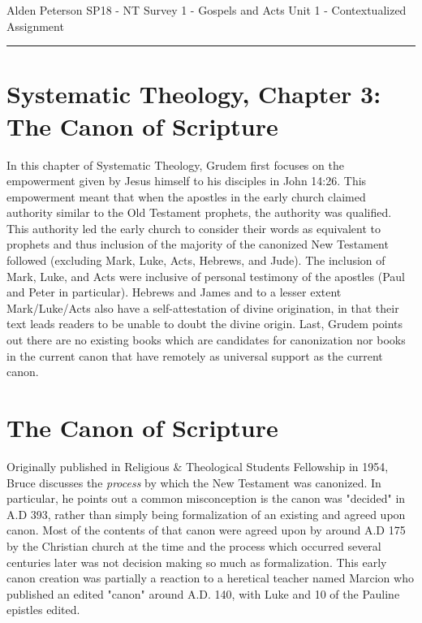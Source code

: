 \documentclass[12pt]{turabian-researchpaper}
\begin{document}
\begin{singlespace}
\noindent Alden Peterson \newline
\noindent SP18 - NT Survey 1 - Gospels and Acts\newline
\noindent Unit 1 - Contextualized Assignment  \newline
\noindent\rule{4cm}{0.4pt}
\end{singlespace}


\section{Systematic Theology, Chapter 3: The Canon of Scripture}

In this chapter of Systematic Theology, Grudem\autocite[pg. 60-68]{grudem2009systematic} first focuses on the empowerment given by Jesus himself to his disciples in John 14:26. This empowerment meant that when the apostles in the early church claimed authority similar to the Old Testament prophets, the authority was qualified. This authority led the early church to consider their words as equivalent to prophets and thus inclusion of the majority of the canonized New Testament followed (excluding Mark, Luke, Acts, Hebrews, and Jude). The inclusion of Mark, Luke, and Acts were inclusive of personal testimony of the apostles (Paul and Peter in particular). Hebrews and James and to a lesser extent Mark/Luke/Acts also have a self-attestation of divine origination, in that their text leads readers to be unable to doubt the divine origin. Last, Grudem points out there are no existing books which are candidates for canonization nor books in the current canon that have remotely as universal support as the current canon.

\section{The Canon of Scripture}
Originally published in Religious \& Theological Students Fellowship in 1954, Bruce\autocite[pp. 159-161]{bruce1988canon} discusses the \textit{process} by which the New Testament was canonized. In particular, he points out a common misconception is the canon was "decided" in A.D 393, rather than simply being formalization of an existing and agreed upon canon. Most of the contents of that canon were agreed upon by around A.D 175 by the Christian church at the time and the process which occurred several centuries later was not decision making so much as formalization. This early canon creation was partially a reaction to a heretical teacher named Marcion who published an edited "canon" around A.D. 140, with Luke and 10 of the Pauline epistles edited.
\end{document}
